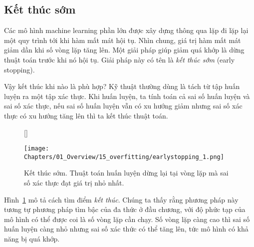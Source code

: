 \subsection{Kết thúc sớm}
Các mô hình machine learning phần lớn được xây dựng thông qua lặp đi lặp lại một
quy trình tới khi hàm mất mát hội tụ. Nhìn chung, giá trị hàm mất mát giảm dần
khi số vòng lặp tăng lên. Một giải pháp giúp giảm quá khớp là dừng thuật toán
trước khi nó hội tụ. Giải pháp này có tên là \textit{kết thúc sớm} (early stopping).

Vậy kết thúc khi nào là phù hợp? Kỹ thuật thường dùng là tách từ tập huấn luyện ra
một tập xác thực. Khi huấn luyện, ta tính toán cả sai số huấn luyện và sai số
xác thực, nếu sai số huấn luyện vẫn có xu hướng giảm nhưng sai số xác thực có xu
hướng tăng lên thì ta kết thúc thuật toán.

 

\begin{figure}[t]
    [\FBwidth]
    {\caption{ 
    Kết thúc sớm. Thuật toán
    huấn luyện dừng lại tại vòng lặp mà sai số xác thực đạt giá trị nhỏ nhất. }
    \label{fig:15_earlystopping}}
    { %
    \texttt{[image: Chapters/01\_Overview/15\_overfitting/earlystopping\_1.png]}
    }
\end{figure}


Hình~\ref{fig:15_earlystopping} mô tả cách tìm điểm \textit{kết thúc}. Chúng ta
thấy rằng phương pháp này tương tự phương pháp tìm bậc của đa thức ở đầu chương,
với độ phức tạp của mô hình có thể được coi là số vòng lặp cần chạy. Số vòng lặp
càng cao thì sai số huấn luyện càng nhỏ nhưng sai số xác thức có thể tăng lên, tức mô hình có khả năng bị quá khớp.
 
